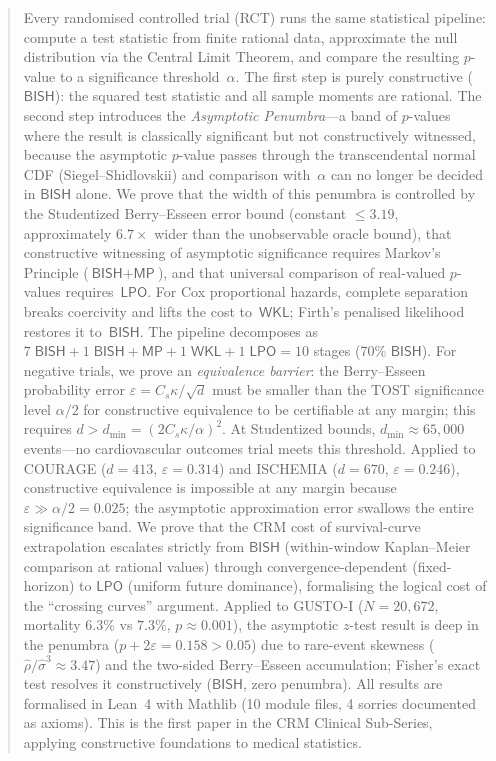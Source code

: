 \documentclass[11pt,a4paper]{article}
\theoremstyle{plain}
\theoremstyle{definition}
\newcommand{\BISH}{\textsf{BISH}}
\newcommand{\WKL}{\textsf{WKL}}
\newcommand{\LPO}{\textsf{LPO}}
\newcommand{\MP}{\textsf{MP}}
\begin{document}
\begin{abstract}
Every randomised controlled trial (RCT) runs the same statistical pipeline: compute a test statistic from finite rational data, approximate the null distribution via the Central Limit Theorem, and compare the resulting $p$-value to a significance threshold~$\alpha$.  The first step is purely constructive ($\BISH$): the squared test statistic and all sample moments are rational.  The second step introduces the \emph{Asymptotic Penumbra}---a band of $p$-values where the result is classically significant but not constructively witnessed, because the asymptotic $p$-value passes through the transcendental normal CDF (Siegel--Shidlovskii) and comparison with~$\alpha$ can no longer be decided in $\BISH$ alone.  We prove that the width of this penumbra is controlled by the Studentized Berry--Esseen error bound (constant $\leq 3.19$, approximately $6.7\times$ wider than the unobservable oracle bound), that constructive witnessing of asymptotic significance requires Markov's Principle ($\BISH + \MP$), and that universal comparison of real-valued $p$-values requires~$\LPO$.  For Cox proportional hazards, complete separation breaks coercivity and lifts the cost to~$\WKL$; Firth's penalised likelihood restores it to~$\BISH$.  The pipeline decomposes as $7\;\BISH + 1\;\BISH{+}\MP + 1\;\WKL + 1\;\LPO = 10$ stages (70\% $\BISH$).  For negative trials, we prove an \emph{equivalence barrier}: the Berry--Esseen probability error $\varepsilon = C_s \kappa / \sqrt{d}$ must be smaller than the TOST significance level $\alpha/2$ for constructive equivalence to be certifiable at any margin; this requires $d > d_{\min} = (2C_s\kappa/\alpha)^2$.  At Studentized bounds, $d_{\min} \approx 65{,}000$ events---no cardiovascular outcomes trial meets this threshold.  Applied to COURAGE ($d = 413$, $\varepsilon = 0.314$) and ISCHEMIA ($d = 670$, $\varepsilon = 0.246$), constructive equivalence is impossible at any margin because $\varepsilon \gg \alpha/2 = 0.025$; the asymptotic approximation error swallows the entire significance band.  We prove that the CRM cost of survival-curve extrapolation escalates strictly from $\BISH$ (within-window Kaplan--Meier comparison at rational values) through convergence-dependent (fixed-horizon) to $\LPO$ (uniform future dominance), formalising the logical cost of the ``crossing curves'' argument.  Applied to GUSTO-I ($N = 20{,}672$, mortality $6.3\%$ vs $7.3\%$, $p \approx 0.001$), the asymptotic $z$-test result is deep in the penumbra ($p + 2\varepsilon = 0.158 > 0.05$) due to rare-event skewness ($\hat\rho/\hat\sigma^3 \approx 3.47$) and the two-sided Berry--Esseen accumulation; Fisher's exact test resolves it constructively ($\BISH$, zero penumbra).  All results are formalised in Lean~4 with Mathlib (10 module files, 4 sorries documented as axioms).  This is the first paper in the CRM Clinical Sub-Series, applying constructive foundations to medical statistics.
\end{abstract}
\end{document}
